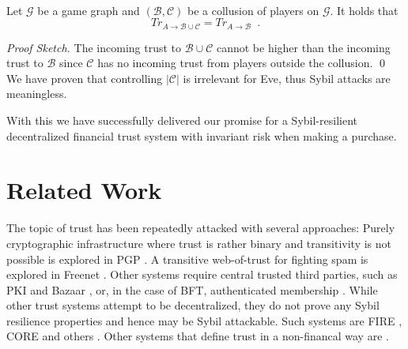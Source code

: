 \documentclass[11pt]{llncs}
\theoremstyle{definition}
\newenvironment{proofsketch}{\textit{Proof Sketch.}}{\qed \smallskip \ \\}
\begin{document}
    \begin{theorem} \ \\
       \label{sybil}
       Let $\mathcal{G}$ be a game graph and $\left(\mathcal{B}, \mathcal{C}\right)$ be a collusion of players on
       $\mathcal{G}$. It holds that
       \begin{equation*}
          Tr_{A \rightarrow \mathcal{B} \cup \mathcal{C}} = Tr_{A \rightarrow \mathcal{B}} \enspace.
       \end{equation*}
    \end{theorem}
    \begin{proofsketch}
       The incoming trust to $\mathcal{B} \cup \mathcal{C}$ cannot be higher than the incoming trust to $\mathcal{B}$ since
       $\mathcal{C}$ has no incoming trust from players outside the collusion.
    \end{proofsketch}
    We have proven that controlling $|\mathcal{C}|$ is irrelevant for Eve, thus Sybil attacks are meaningless.

    With this we have successfully delivered our promise for a Sybil-resilient decentralized financial trust system with
    invariant risk when making a purchase.

  \section{Related Work}
     The topic of trust has been repeatedly attacked with several approaches: Purely cryptographic infrastructure where trust
     is rather binary and transitivity is not possible is explored in PGP \cite{pgp}. A transitive web-of-trust for fighting
     spam is explored in Freenet \cite{freenet}. Other systems require central trusted
     third parties, such as PKI \cite{pki} and Bazaar \cite{bazaar}, or, in the case of BFT, authenticated membership
     \cite{byzantine}. While other trust systems attempt to be decentralized, they do not prove any Sybil resilience
     properties and hence may be Sybil attackable. Such systems are FIRE \cite{fire}, CORE \cite{core} and others
     \cite{openrep,ghkkw,rk}. Other systems that define trust in a non-financal way are
     \cite{mui,beta,pace,vpc,sdt,wot,pathfinder}.
\end{document}
